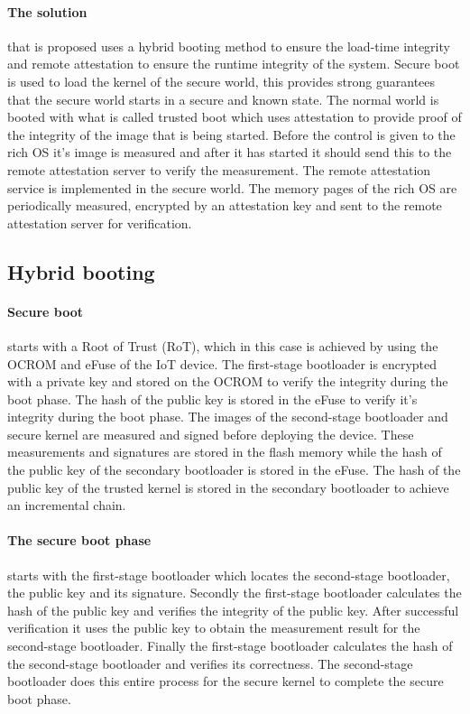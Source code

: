 \paragraph*{The solution}
that is proposed uses a hybrid booting method to ensure the load-time integrity and remote attestation to ensure the runtime integrity of the system. Secure boot is used to load the kernel of the secure world, this provides strong guarantees that the secure world starts in a secure and known state. The normal world is booted with what is called trusted boot which uses attestation to provide proof of the integrity of the image that is being started. Before the control is given to the rich OS it's image is measured and after it has started it should send this to the remote attestation server to verify the measurement. The remote attestation service is implemented in the secure world. The memory pages of the rich OS are periodically measured, encrypted by an attestation key and sent to the remote attestation server for verification.

\subsection*{Hybrid booting}

\paragraph*{Secure boot}
starts with a Root of Trust (RoT), which in this case is achieved by using the OCROM and eFuse of the IoT device. The first-stage bootloader is encrypted with a private key and stored on the OCROM to verify the integrity during the boot phase. The hash of the public key is stored in the eFuse to verify it's integrity during the boot phase. The images of the second-stage bootloader and secure kernel are measured and signed before deploying the device. These measurements and signatures are stored in the flash memory while the hash of the public key of the secondary bootloader is stored in the eFuse. The hash of the public key of the trusted kernel is stored in the secondary bootloader to achieve an incremental chain.

\paragraph*{The secure boot phase}
starts with the first-stage bootloader which locates the second-stage bootloader, the public key and its signature. Secondly the first-stage bootloader calculates the hash of the public key and verifies the integrity of the public key. After successful verification it uses the public key to obtain the measurement result for the second-stage bootloader. Finally the first-stage bootloader calculates the hash of the second-stage bootloader and verifies its correctness. The second-stage bootloader does this entire process for the secure kernel to complete the secure boot phase.

